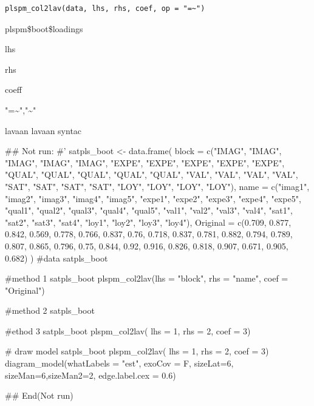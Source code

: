 \documentclass[a4paper]{book}
\begin{document}
%
\begin{Usage}
\begin{verbatim}
plspm_col2lav(data, lhs, rhs, coef, op = "=~")
\end{verbatim}
\end{Usage}
%
\begin{Arguments}
\begin{ldescription}
\item[\code{data}] plspm\$boot\$loadings

\item[\code{lhs}] lhs

\item[\code{rhs}] rhs

\item[\code{coef}] coeff

\item[\code{op}] "=\textasciitilde{}","\textasciitilde{}"
\end{ldescription}
\end{Arguments}
%
\begin{Value}
lavaan lavaan syntac
\end{Value}
%
\begin{Examples}
\begin{ExampleCode}

\#\# Not run: 
#'
satpls_boot <- data.frame(
  block = c("IMAG", "IMAG", "IMAG",
  "IMAG", "IMAG", "EXPE", "EXPE",
  "EXPE", "EXPE", "EXPE", "QUAL",
  "QUAL", "QUAL", "QUAL", "QUAL",
  "VAL", "VAL", "VAL", "VAL", "SAT",
  "SAT", "SAT", "SAT", "LOY", "LOY",
  "LOY", "LOY"),
  name = c("imag1", "imag2", "imag3",
   "imag4", "imag5", "expe1", "expe2",
    "expe3", "expe4", "expe5", "qual1",
     "qual2", "qual3", "qual4", "qual5",
     "val1", "val2", "val3", "val4",
     "sat1", "sat2", "sat3", "sat4",
     "loy1", "loy2", "loy3", "loy4"),
  Original = c(0.709, 0.877, 0.842,
   0.569, 0.778, 0.766, 0.837, 0.76,
   0.718, 0.837, 0.781, 0.882, 0.794,
    0.789, 0.807, 0.865, 0.796, 0.75,
    0.844, 0.92, 0.916, 0.826, 0.818,
     0.907, 0.671, 0.905, 0.682)
)
#data
satpls_boot

#method 1
satpls_boot %
plspm_col2lav(lhs = "block", rhs = "name", coef = "Original")

#method 2
satpls_boot %

#ethod 3
satpls_boot %
plspm_col2lav( lhs = 1, rhs = 2, coef = 3)

# draw model
satpls_boot %
plspm_col2lav( lhs = 1, rhs = 2, coef = 3)%
  diagram_model(whatLabels = "est", exoCov = F,
  sizeLat=6, sizeMan=6,sizeMan2=2,
                edge.label.cex = 0.6)



## End(Not run)

\end{ExampleCode}
\end{Examples}
\end{document}
